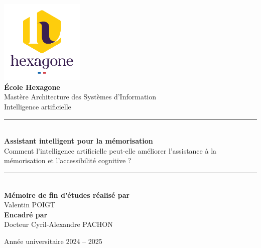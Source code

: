 \documentclass[12pt,a4paper]{report}
\begin{document}
\justifying %
\onehalfspacing %
\addtolength{\parskip}{6pt} %
\setlength{\parindent}{15pt} %

\begin{titlepage}
    \begin{center}
        \vspace*{\fill}

                \includegraphics[width=0.3\textwidth]{images/logo.png}\\[1cm]
                
                {\Large \textbf{École Hexagone}}\\[0.5cm]
                {\small Mastère Architecture des Systèmes d'Information}\\[0.5cm]
                {\small Intelligence artificielle}\\[0.5cm]

                \rule{\linewidth}{0.5mm}\\[1cm]
                
                {\LARGE \textbf{Assistant intelligent pour la mémorisation}} \\[0.5cm]
                {\Large Comment l'intelligence artificielle peut-elle améliorer l'assistance à la mémorisation et l'accessibilité cognitive ?}\\[0.5cm]

                \rule{\linewidth}{0.5mm}\\[1cm]
                
                \textbf{Mémoire de fin d'études réalisé par}\\
                {\Large Valentin POIGT}\\[1cm]
                
                \textbf{Encadré par}\\
                {\Large Docteur Cyril-Alexandre PACHON}\\[0.5cm]

                \vspace*{\fill}
                
                {\Large Année universitaire 2024 – 2025}
        \vspace*{\fill}
    \end{center}
\end{titlepage}
\end{document}
